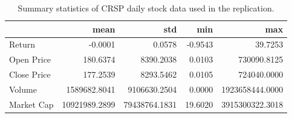 \begin{table}
\centering
\caption{Summary statistics of CRSP daily stock data used in the replication.}
\label{tab:crsp_summary}
\begin{tabular}{lrrrr}
\toprule
{} &          mean &           std &     min &             max \\
\midrule
Return      &       -0.0001 &        0.0578 & -0.9543 &         39.7253 \\
Open Price  &      180.6374 &     8390.2038 &  0.0103 &     730090.8125 \\
Close Price &      177.2539 &     8293.5462 &  0.0105 &     724040.0000 \\
Volume      &  1589682.8041 &  9106630.2504 &  0.0000 & 1923658444.0000 \\
Market Cap  & 10921989.2899 & 79438764.1831 & 19.6020 & 3915300322.3018 \\
\bottomrule
\end{tabular}
\end{table}
